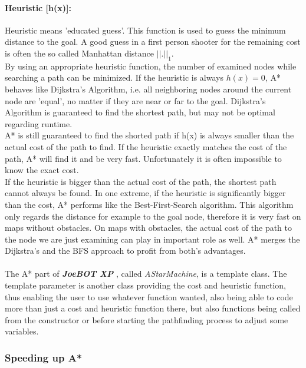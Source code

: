 \documentclass[12pt]{article}
\newcommand {\joebotxp}{\textit{\textbf{JoeBOT XP}} }
\begin{document}
\paragraph{Heuristic [h(x)]:} Heuristic means 'educated guess'. This function is used to guess the minimum distance to the goal. A good guess in a first person shooter for the remaining cost is often the so called Manhattan distance \(||.||_{1}\).\\
By using an appropriate heuristic function, the number of examined nodes while searching a path can be minimized. If the heuristic is always \(h(x) = 0 \), A* behaves like Dijkstra's Algorithm, i.e. all neighboring nodes around the current node are 'equal', no matter if they are near or far to the goal. Dijkstra's Algorithm is guaranteed to find the shortest path, but may not be optimal regarding runtime.\\
A* is still guaranteed to find the shorted path if h(x) is always smaller than the actual cost of the path to find. If the heuristic exactly matches the cost of the path, A* will find it and be very fast. Unfortunately it is often impossible to know the exact cost.\\
If the heuristic is bigger than the actual cost of the path, the shortest path cannot always be found. In one extreme, if the heuristic is significantly bigger than the cost, A* performs like the Best-First-Search algorithm. This algorithm only regards the distance for example to the goal node, therefore it is very fast on maps without obstacles. On maps with obstacles, the actual cost of the path to the node we are just examining can play in important role as well. A* merges the Dijkstra's and the BFS approach to profit from both's advantages.
\paragraph{}
The A* part of \joebotxp, called \textit{AStarMachine}, is a template class. The template parameter is another class providing the cost and heuristic function, thus enabling the user to use whatever function wanted, also being able to code more than just a cost and heuristic function there, but also functions being called from the constructor or before starting the pathfinding process to adjust some variables.

\subsubsection{Speeding up A*}
\end{document}
